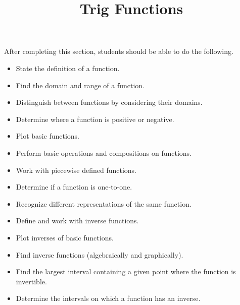 \documentclass{ximera}
\title{Trig Functions}
\begin{document}
\begin{abstract} 
\end{abstract}

\maketitle

\begin{sectionOutcomes}
After completing this section, students should be able to do the following.

\begin{itemize}
	\item State the definition of a function.
	\item Find the domain and range of a function.
	\item Distinguish between functions by considering their domains.
	\item Determine where a function is positive or negative.
	\item Plot basic functions.
        \item Perform basic operations and compositions on
          functions.
        \item Work with piecewise defined functions.
	\item Determine if a function is one-to-one.
	\item Recognize different representations of the same function.
        \item Define and work with inverse functions.
        \item Plot inverses of basic functions.
	\item Find inverse functions (algebraically and graphically).
        \item Find the largest interval containing a given point
          where the function is invertible.
	\item Determine the intervals on which a function has an inverse.

\end{itemize}
\end{sectionOutcomes}
\end{document}
